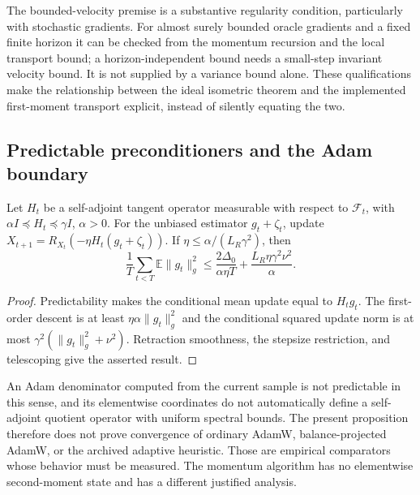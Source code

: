 The bounded-velocity premise is a substantive regularity condition,
particularly with stochastic gradients. For almost surely bounded oracle
gradients and a fixed finite horizon it can be checked from the momentum
recursion and the local transport bound; a horizon-independent bound
needs a small-step invariant velocity bound. It is not supplied by a
variance bound alone. These qualifications make the relationship between
the ideal isometric theorem and the implemented first-moment transport
explicit, instead of silently equating the two.

\subsection{Predictable preconditioners and the Adam boundary}
\begin{proposition}
\label{prop:predictable-preconditioner}
Let $H_t$ be a self-adjoint tangent operator measurable with respect to
$\mathcal F_t$, with $\alpha I\preceq H_t\preceq\gamma I$, $\alpha>0$.
For the unbiased estimator $g_t+\zeta_t$, update
$X_{t+1}=R_{X_t}(-\eta H_t(g_t+\zeta_t))$.
If $\eta\leq\alpha/(L_R\gamma^2)$, then
\begin{equation}
 \frac1T\sum_{t<T}\mathbb E\|g_t\|_g^2
 \leq\frac{2\Delta_0}{\alpha\eta T}
            +\frac{L_R\eta\gamma^2\nu^2}{\alpha}.
 \label{eq:preconditioned-rate}
\end{equation}
\end{proposition}
\begin{proof}
Predictability makes the conditional mean update equal to $H_tg_t$.
The first-order descent is at least $\eta\alpha\|g_t\|_g^2$ and the
conditional squared update norm is at most
$\gamma^2(\|g_t\|_g^2+\nu^2)$. Retraction smoothness, the stepsize
restriction, and telescoping give the asserted result.
\end{proof}

An Adam denominator computed from the current sample is not predictable
in this sense, and its elementwise coordinates do not automatically define
a self-adjoint quotient operator with uniform spectral bounds. The present
proposition therefore does not prove convergence of ordinary AdamW,
balance-projected AdamW, or the archived adaptive heuristic. Those are
empirical comparators whose behavior must be measured. The momentum
algorithm has no elementwise second-moment state and has a different
justified analysis.

